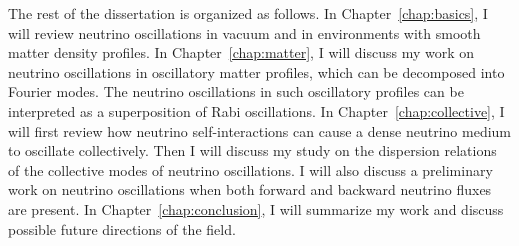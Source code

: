 The rest of the dissertation is organized as follows.
In Chapter~\ref{chap:basics}, I will review neutrino oscillations in vacuum and in environments with smooth matter density profiles.
In Chapter~\ref{chap:matter}, I will discuss my work on neutrino oscillations in oscillatory matter profiles, which can be decomposed into Fourier modes. The neutrino oscillations in such oscillatory profiles can be interpreted as a superposition of Rabi oscillations.
In Chapter~\ref{chap:collective}, I will first review how neutrino self-interactions can cause a dense neutrino medium to oscillate collectively. Then I will discuss my study on the dispersion relations of the collective modes of neutrino oscillations.
I will also discuss a preliminary work on neutrino oscillations when both forward and backward neutrino fluxes are present.
In Chapter~\ref{chap:conclusion}, I will summarize my work and discuss possible future directions of the field.
